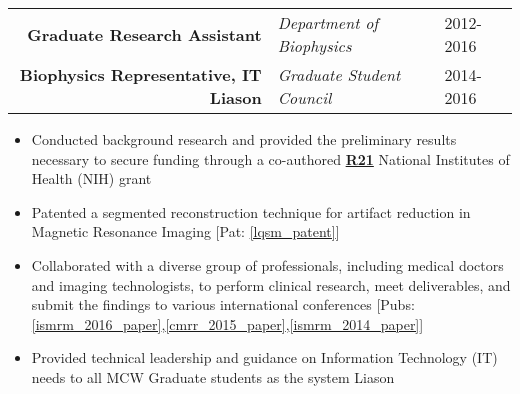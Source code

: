 
\begin{minipage}{\textwidth}
	\begin{center}
		\begin{tabular}{rll}
			\textbf{Graduate Research Assistant} & \textit{Department of Biophysics} & 2012-2016\none \\
			\textbf{Biophysics Representative, IT Liason} & \textit{Graduate Student Council} & 2014-2016\ntwo \\
		\end{tabular}
	\end{center}
\end{minipage}

\begin{minipage}{\textwidth}
	\begin{itemize}
	\item Conducted background research and provided the preliminary results necessary to secure funding through a co-authored \href{https://grants.nih.gov/grants/funding/r21.htm}{\textbf{R21}} National Institutes of Health (NIH) grant\none
   	\item Patented a segmented reconstruction technique for artifact reduction in Magnetic Resonance Imaging [Pat: \ref{lqsm_patent}]\none
	\item Collaborated with a diverse group of professionals, including medical doctors and imaging technologists, to perform clinical research, meet deliverables, and submit the findings to 
             various international conferences [Pubs: \ref{ismrm_2016_paper},\ref{cmrr_2015_paper},\ref{ismrm_2014_paper}]\none
	\item Provided technical leadership and guidance on Information Technology (IT) needs to all MCW Graduate students as the system Liason\ntwo
	\end{itemize}
\end{minipage}


